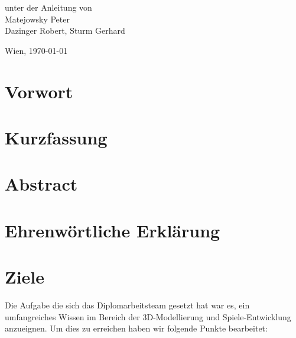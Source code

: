 \documentclass[
    headings=optiontotocandhead,%
    twoside,
    numbers=noenddot,%
    toc=flat, %
    12pt, %
    titlepage, %
    parskip=full, %
    listof=totoc, %
    listof=flat, %
    numbers=noenddot, %
    bibliography=totoc, %
    a4paper,DIV=14,
    BCOR=15mm,
]{scrbook}
\begin{document}
\begin{titlepage}
\begin{center}
\par\end{center}{\large \par}

\begin{center}
\vspace{20mm}
 \normalsize unter der Anleitung von\\
 \vspace{0.5cm}
Matejowsky Peter\\
Dazinger Robert,
Sturm Gerhard
\par\end{center}

\begin{center}
\vspace{5mm}
Wien, \today
\par\end{center}

\end{titlepage}%
\chapter*{Vorwort}


\chapter*{Kurzfassung}


\chapter*{Abstract}


\chapter*{Ehrenwörtliche Erklärung}


\cleardoublepage{}
\tableofcontents{}



\cleardoublepage{}
\mainmatter

\chapter{Ziele}
Die Aufgabe die sich das Diplomarbeitsteam gesetzt hat war es, ein umfangreiches Wissen im
Bereich der 3D-Modellierung und Spiele-Entwicklung anzueignen.
Um dies zu erreichen haben wir folgende Punkte bearbeitet:
\end{document}
